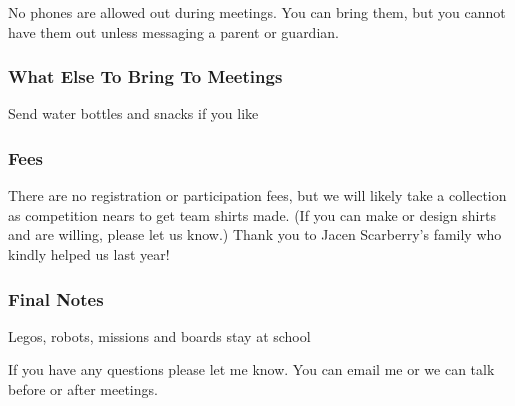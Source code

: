 \documentclass[letter]{article}
\begin{document}
No phones are allowed out during meetings. You can bring them, but you
cannot have them out unless messaging a parent or guardian.

\hypertarget{what-else-to-bring-to-meetings}{%
\subsubsection{What Else To Bring To
Meetings}\label{what-else-to-bring-to-meetings}}

Send water bottles and snacks if you like

\hypertarget{fees}{%
\subsubsection{Fees}\label{fees}}

There are no registration or participation fees, but we will likely take
a collection as competition nears to get team shirts made. (If you can
make or design shirts and are willing, please let us know.) Thank you to
Jacen Scarberry's family who kindly helped us last year!

\hypertarget{final-notes}{%
\subsubsection{Final Notes}\label{final-notes}}

Legos, robots, missions and boards stay at school

If you have any questions please let me know. You can email me or we can
talk before or after meetings.
\end{document}
